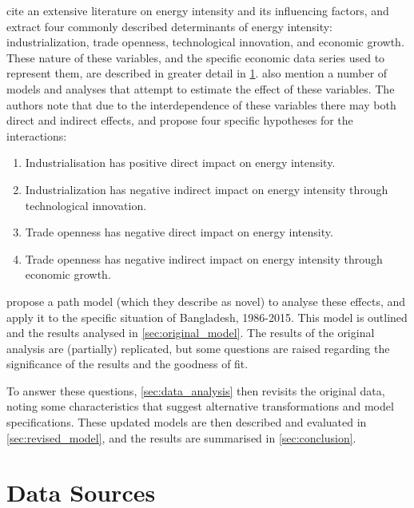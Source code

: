 \documentclass[11pt,a4paper]{article}
\begin{document}
\cite{panHowIndustrializationTrade2019} cite an extensive literature on energy intensity and its influencing factors, and extract four commonly described determinants of energy intensity: industrialization, trade openness, technological innovation, and economic growth.
These nature of these variables, and the specific economic data series used to represent them, are described in greater detail in \cref{sec:data_sources}.
\cite{panHowIndustrializationTrade2019} also mention a number of models and analyses that attempt to estimate the effect of these variables. 
The authors note that due to the interdependence of these variables there may both direct and indirect effects, and propose four specific hypotheses for the interactions:
\begin{enumerate}[label=\textbf{H.\arabic*}]
\item Industrialisation has positive direct impact on energy intensity.
\item Industrialization has negative indirect impact on energy intensity through technological innovation.
\item Trade openness has negative direct impact on energy intensity.
\item Trade openness has negative indirect impact on energy intensity through economic growth.
\end{enumerate}

\cite{panHowIndustrializationTrade2019} propose a path model (which they describe as novel) to analyse these effects, and apply it to the specific situation of Bangladesh, 1986-2015.
This model is outlined and the results analysed in \cref{sec:original_model}.
The results of the original analysis are (partially) replicated, but some questions are raised regarding the significance of the results and the goodness of fit.

To answer these questions, \cref{sec:data_analysis} then revisits the original data, noting some characteristics that suggest alternative transformations and model specifications.
These updated models are then described and evaluated in \cref{sec:revised_model}, and the results are summarised in \cref{sec:conclusion}.

\clearpage

\section{Data Sources}\label{sec:data_sources}
 
\end{document}
